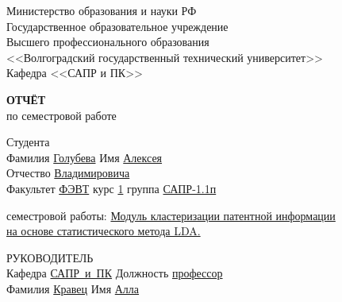 \documentclass[a4paper, 14pt]{extreport}
\begin{document}
    \begin{titlepage}
        \begin{center}
            Министерство образования и науки РФ \\
            Государственное образовательное учреждение\\
            Высшего профессионального образования\\
            <<Волгоградский государственный технический университет>>\\
            Кафедра <<САПР и ПК>>
        \end{center}
        \vspace{2.0cm}
        \begin{center}
            \large \textbf{ОТЧЁТ} \\
            по семестровой работе
        \end{center}
        \begin{flushleft}
            Студента\\
            Фамилия \underline{Голубева\hspace{3.1cm}} 
            Имя \underline{Алексея\hspace{2.1cm}}\\
            Отчество \underline{Владимировича\hspace{1.6cm}}\\
            Факультет \underline{ФЭВТ\hspace{3.45cm}} курс \underline{1\hspace{1.5cm}} 
            группа \underline{САПР-1.1п\hspace{1.9cm}}\\
        \end{flushleft}
        \vspace{1.0cm}
         семестровой работы: \underline{Модуль кластеризации патентной информации}\\
        \underline{на основе статистического метода LDA.\hspace{7.4cm}}
        \vspace{2.0cm}
        \begin{flushleft}
            РУКОВОДИТЕЛЬ\\
            Кафедра \underline{САПР~и~ПК\hspace{2.4cm}} Должность \underline{профессор\hspace{2.8cm}} \\
            Фамилия \underline{Кравец\hspace{3.3cm}} Имя \underline{Алла\hspace{5.5cm}}\\

\end{flushleft}
\end{titlepage}
\end{document}
